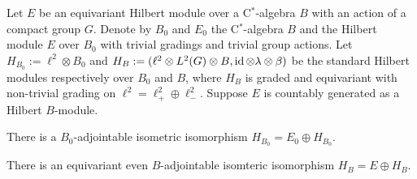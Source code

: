 \documentclass{../../large}
\begin{document}
\begin{prb}
Let $E$ be an equivariant Hilbert module over a C$^*$-algebra $B$ with an action of a compact group $G$.
Denote by $B_0$ and $E_0$ the C$^*$-algebra $B$ and the Hilbert module $E$ over $B_0$ with trivial gradings and trivial group actions.
Let $H_{B_0}:=\ell^2\otimes B_0$ and $H_B:=(\ell^2\otimes L^2(G)\otimes B,\operatorname{id}\otimes\lambda\otimes\beta)$ be the standard Hilbert modules respectively over $B_0$ and $B$, where $H_B$ is graded and equivariant with non-trivial grading on $\ell^2=\ell^2_+\oplus\ell^2_-$.
Suppose $E$ is countably generated as a Hilbert $B$-module.
\begin{parts}
\item There is a $B_0$-adjointable isometric isomorphism $H_{B_0}=E_0\oplus H_{B_0}$.
\item There is an equivariant even $B$-adjointable isomteric isomorphism $H_B=E\oplus H_B$.
\end{parts}
\end{prb}
\end{document}

